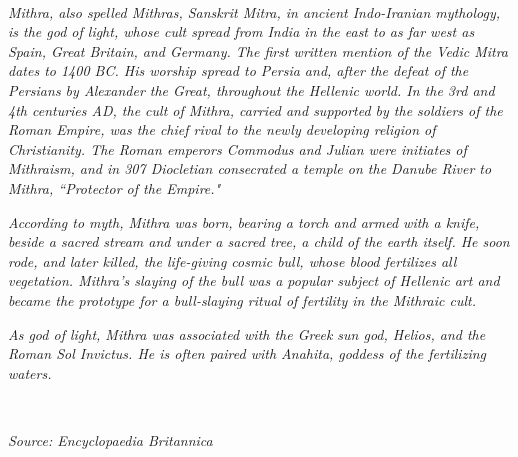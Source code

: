 \documentclass{report}
\begin{document}
\newpage

\

\vspace{8cm}

{\large \noindent \textit{Mithra, also spelled Mithras, Sanskrit Mitra, in ancient Indo-Iranian mythology, is the god of light, whose cult spread from India in the east to as far west as Spain, Great Britain, and Germany. The first written mention of the Vedic Mitra dates to 1400 BC. His worship spread to Persia and, after the defeat of the Persians by Alexander the Great, throughout the Hellenic world. In the 3rd and 4th centuries AD, the cult of Mithra, carried and supported by the soldiers of the Roman Empire, was the chief rival to the newly developing religion of Christianity. The Roman emperors Commodus and Julian were initiates of Mithraism, and in 307 Diocletian consecrated a temple on the Danube River to Mithra, ``Protector of the Empire."}

\noindent \textit{According to myth, Mithra was born, bearing a torch and armed with a knife, beside a sacred stream and under a sacred tree, a child of the earth itself. He soon rode, and later killed, the life-giving cosmic bull, whose blood fertilizes all vegetation. Mithra's slaying of the bull was a popular subject of Hellenic art and became the prototype for a bull-slaying ritual of fertility in the Mithraic cult.}

\noindent \textit{As god of light, Mithra was associated with the Greek sun god, Helios, and the Roman Sol Invictus. He is often paired with Anahita, goddess of the fertilizing waters.}

\

\hspace{10cm} \textit{Source: Encyclopaedia Britannica}}

\newpage
\tableofcontents
\listoftables
\listoffigures







% 









\printindex



\end{document}
